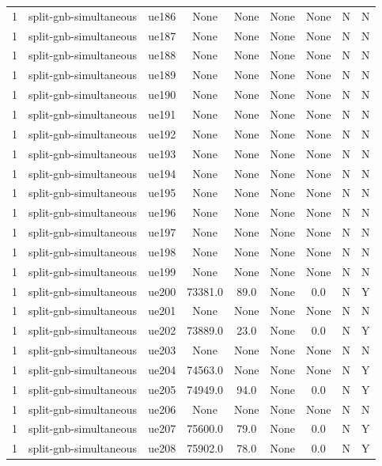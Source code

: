 \begin{table}[ht]
\begin{tabular}{|c|c|c|c|c|c|c|c|c|}
1 & split-gnb-simultaneous & ue186 & None & None & None & None & N & N \\
1 & split-gnb-simultaneous & ue187 & None & None & None & None & N & N \\
1 & split-gnb-simultaneous & ue188 & None & None & None & None & N & N \\
1 & split-gnb-simultaneous & ue189 & None & None & None & None & N & N \\
1 & split-gnb-simultaneous & ue190 & None & None & None & None & N & N \\
1 & split-gnb-simultaneous & ue191 & None & None & None & None & N & N \\
1 & split-gnb-simultaneous & ue192 & None & None & None & None & N & N \\
1 & split-gnb-simultaneous & ue193 & None & None & None & None & N & N \\
1 & split-gnb-simultaneous & ue194 & None & None & None & None & N & N \\
1 & split-gnb-simultaneous & ue195 & None & None & None & None & N & N \\
1 & split-gnb-simultaneous & ue196 & None & None & None & None & N & N \\
1 & split-gnb-simultaneous & ue197 & None & None & None & None & N & N \\
1 & split-gnb-simultaneous & ue198 & None & None & None & None & N & N \\
1 & split-gnb-simultaneous & ue199 & None & None & None & None & N & N \\
1 & split-gnb-simultaneous & ue200 & 73381.0 & 89.0 & None & 0.0 & N & Y \\
1 & split-gnb-simultaneous & ue201 & None & None & None & None & N & N \\
1 & split-gnb-simultaneous & ue202 & 73889.0 & 23.0 & None & 0.0 & N & Y \\
1 & split-gnb-simultaneous & ue203 & None & None & None & None & N & N \\
1 & split-gnb-simultaneous & ue204 & 74563.0 & None & None & None & N & Y \\
1 & split-gnb-simultaneous & ue205 & 74949.0 & 94.0 & None & 0.0 & N & Y \\
1 & split-gnb-simultaneous & ue206 & None & None & None & None & N & N \\
1 & split-gnb-simultaneous & ue207 & 75600.0 & 79.0 & None & 0.0 & N & Y \\
1 & split-gnb-simultaneous & ue208 & 75902.0 & 78.0 & None & 0.0 & N & Y \\

\end{tabular}
\end{table}
